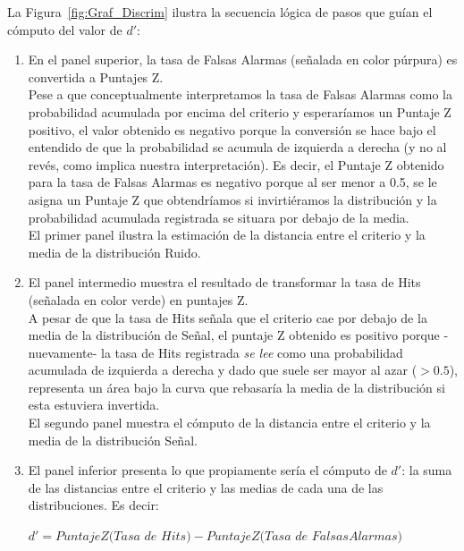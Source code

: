 \begin{itemize}
La Figura~\ref{fig:Graf_Discrim} ilustra la secuencia lógica de pasos que guían el cómputo del valor de $d'$:\\

\begin{enumerate}
\item En el panel superior, la tasa de Falsas Alarmas (señalada en color púrpura) es convertida a Puntajes Z.\\

Pese a que conceptualmente interpretamos la tasa de Falsas Alarmas como la probabilidad acumulada por encima del criterio y esperaríamos un Puntaje Z positivo, el valor obtenido es negativo porque la conversión se hace bajo el entendido de que la probabilidad se acumula de izquierda a derecha (y no al revés, como implica nuestra interpretación). Es decir, el Puntaje Z obtenido para la tasa de Falsas Alarmas es negativo porque al ser menor a 0.5, se le asigna un Puntaje Z que obtendríamos si invirtiéramos la distribución y la probabilidad acumulada registrada se situara por debajo de la media.\\

El primer panel ilustra la estimación de la distancia entre el criterio y la media de la distribución Ruido.\\

\item El panel intermedio muestra el resultado de transformar la tasa de Hits (señalada en color verde) en puntajes Z.\\

A pesar de que la tasa de Hits señala que el criterio cae por debajo de la media de la distribución de Señal, el puntaje Z obtenido es positivo porque -nuevamente- la tasa de Hits registrada \textit{se lee} como una probabilidad acumulada de izquierda a derecha y dado que suele ser mayor al azar ($> 0.5$), representa un área bajo la curva que rebasaría la media de la distribución si esta estuviera invertida.\\

El segundo panel muestra el cómputo de la distancia entre el criterio y la media de la distribución Señal.\\

\item El panel inferior presenta lo que propiamente sería el cómputo de $d'$: la suma de las distancias entre el criterio y las medias de cada una de las distribuciones. Es decir:\\

\begin{center}
$d' = PuntajeZ(Tasa$ $de$ $Hits) - PuntajeZ(Tasa$ $de$ $Falsas Alarmas)$\\
\end{center}


\end{enumerate}
\end{itemize}
